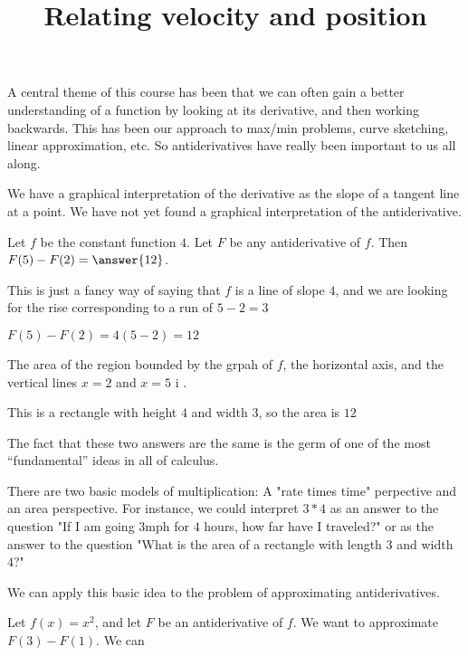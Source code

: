 \documentclass{ximera}
\title[Dig-In:]{Relating velocity and position}
\begin{document}
A central theme of this course has been that we can often gain a
better understanding of a function by looking at its derivative, and
then working backwards.  This has been our approach to max/min
problems, curve sketching, linear approximation, etc.  So
antiderivatives have really been important to us all along.

We have a graphical interpretation of the derivative as the slope of a
tangent line at a point.  We have not yet found a graphical
interpretation of the antiderivative.
\begin{question}
  \begin{question}
   Let $f$ be the constant function $4$. Let $F$ be any antiderivative
   of $f$.  Then $F(5)-F(2) = \answer{12}$.
   \begin{hint}
    This is just a fancy way of saying that $f$ is a line of slope
    $4$, and we are looking for the rise corresponding to a run of
    $5-2= 3$
   \end{hint}
   \begin{hint}
    $F(5) - F(2) = 4(5-2) = 12$
   \end{hint}
  \end{question}
  
  \begin{question}
    The area of the region bounded by the grpah of $f$, the horizontal
    axis, and the vertical lines $x=2$ and $x=5$ i .
    
    \begin{hint}
    \end{hint}
    \begin{hint}
      This is a rectangle with height $4$ and width $3$, so the area is $12$
    \end{hint}
  \end{question}
\end{question}

The fact that these two answers are the same is the germ of one of the
most ``fundamental'' ideas in all of calculus.

\begin{idea}
  There are two basic models of multiplication: A "rate times time"
  perpective and an area perspective.  For instance, we could
  interpret $3*4$ as an answer to the question "If I am going $3
  \textrm{mph}$ for $4$ hours, how far have I traveled?" or as the
  answer to the question "What is the area of a rectangle with length
  $3$ and width $4$?"
\end{idea}

We can apply this basic idea to the problem of approximating
antiderivatives.

\begin{example}
Let $f(x) = x^2$, and let $F$ be an antiderivative of $f$.  We want to
approximate $F(3) - F(1)$.  We can
\end{example}
\end{document}
